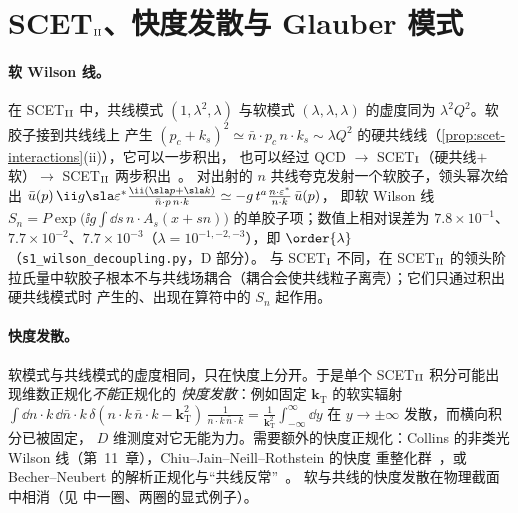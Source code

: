 \section{SCET\texorpdfstring{$_{\rm II}$}{II}、快度发散与 Glauber 模式}\label{sec:scet-II}

\paragraph{软 Wilson 线。}
在 SCET$_{\rm II}$ 中，共线模式 $(1,\lambda^2,\lambda)$ 与软模式 $(\lambda,\lambda,\lambda)$ 的虚度同为 $\lambda^2Q^2$。软胶子接到共线线上
产生 $(p_c+k_s)^2\simeq\bar n\cdot p_c\,n\cdot k_s\sim\lambda Q^2$ 的硬共线线（\cref{prop:scet-interactions}(ii)），它可以一步积出，
也可以经过 QCD $\to$ SCET$_{\rm I}$（硬共线$+$软）$\to$ SCET$_{\rm II}$ 两步积出~\cite{BauerEtAl2002,HillNeubert2003,BenekeFeldmann2004}。
对出射的 $n$ 共线夸克发射一个软胶子，领头幂次给出
$\bar u(p)\,\ii g\sla\varepsilon^*\frac{\ii(\sla p+\sla k)}{\bar n\cdot p\,n\cdot k}\simeq-g\,t^a\frac{n\cdot\varepsilon^*}{n\cdot k}\,\bar u(p)$，
即软 Wilson 线 $S_n=P\exp\big(\ii g\int\dd s\,n\cdot A_s(x+sn)\big)$ 的单胶子项；数值上相对误差为
$7.8\times10^{-1}$、$7.7\times10^{-2}$、$7.7\times10^{-3}$（$\lambda=10^{-1,-2,-3}$），即 $\order{\lambda}$（\texttt{s1\_\allowbreak wilson\_\allowbreak decoupling.py}，D 部分）。
与 SCET$_{\rm I}$ 不同，在 SCET$_{\rm II}$ 的领头阶拉氏量中软胶子根本不与共线场耦合（耦合会使共线粒子离壳）；它们只通过积出硬共线模式时
产生的、出现在算符中的 $S_n$ 起作用。

\paragraph{快度发散。}
软模式与共线模式的虚度相同，只在快度上分开。于是单个 SCET$_{\rm II}$ 积分可能出现维数正规化\emph{不能}正规化的
\emph{快度发散}：例如固定 $\bm k_{\mathrm T}$ 的软实辐射 $\int\dd n\cdot k\,\dd\bar n\cdot k\,\delta(n\cdot k\,\bar n\cdot k-\bm k_{\mathrm T}^2)\,
\frac{1}{n\cdot k\,\bar n\cdot k}=\frac{1}{\bm k_{\mathrm T}^2}\int_{-\infty}^{\infty}\dd y$ 在 $y\to\pm\infty$ 发散，而横向积分已被固定，
$D$ 维测度对它无能为力。需要额外的快度正规化：Collins 的非类光 Wilson 线（第~11~章），Chiu--Jain--Neill--Rothstein 的快度
重整化群~\cite{ChiuEtAl2012a,ChiuEtAl2012b}，或 Becher--Neubert 的解析正规化与“共线反常”~\cite{BecherNeubert2011}。
软与共线的快度发散在物理截面中相消（见 \cite{RothsteinStewart2016} 中一圈、两圈的显式例子）。

